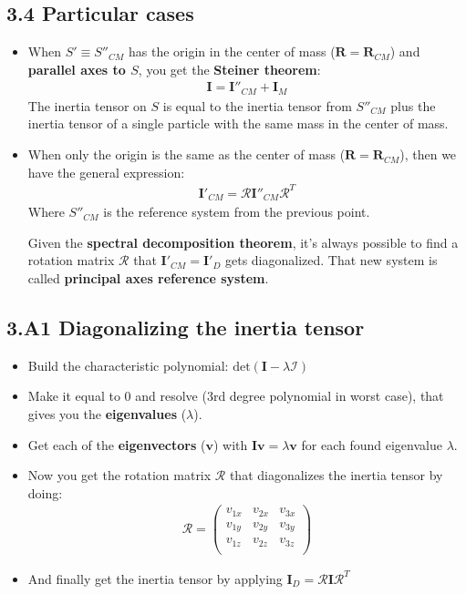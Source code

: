 \documentclass[a4paper,landscape,10pt]{cheatsheet}
\begin{document}
\subsection*{3.4 Particular cases}
\begin{itemize}
  \item When $S'\equiv S''_{CM}$ has the origin in the center of mass ($\textbf{R}=\textbf{R}_{CM}$) and
        \textbf{parallel axes to $S$}, you get the \textbf{Steiner theorem}:
        \begin{gather*}
          \textbf{I}=\textbf{I}''_{CM}+\textbf{I}_{M}
        \end{gather*}
        The inertia tensor on $S$ is equal to the inertia tensor from $S''_{CM}$ plus the inertia tensor of a single particle
        with the same mass in the center of mass.

  \item When only the origin is the same as the center of mass ($\textbf{R}=\textbf{R}_{CM}$), then we have the general
        expression:
        \begin{gather*}
          \textbf{I}'_{CM} = \mathcal{R}\textbf{I}''_{CM}\mathcal{R}^T
        \end{gather*}
        Where $S''_{CM}$ is the reference system from the previous point.

        Given the \textbf{spectral decomposition theorem}, it's always possible to find a rotation matrix $\mathcal{R}$ that $\textbf{I}'_{CM} = \textbf{I}'_D$ gets
        diagonalized. That new system is called \textbf{principal axes reference system}.
\end{itemize}

\subsection*{3.A1 Diagonalizing the inertia tensor}
\begin{itemize}
  \item Build the characteristic polynomial: $\text{det}(\textbf{I} - \lambda\mathcal{I})$
  \item Make it equal to 0 and resolve (3rd degree polynomial in worst case), that gives you the \textbf{eigenvalues}
        ($\lambda$).
  \item Get each of the \textbf{eigenvectors} ($\textbf{v}$) with $\textbf{I}\textbf{v} = \lambda\textbf{v}$ for each
        found eigenvalue $\lambda$.
  \item Now you get the rotation matrix $\mathcal{R}$ that diagonalizes the inertia tensor by doing:
        \begin{gather*}
          \mathcal{R} = \begin{pmatrix*}
            v_{1x} & v_{2x} & v_{3x} \\
            v_{1y} & v_{2y} & v_{3y} \\
            v_{1z} & v_{2z} & v_{3z} \\
          \end{pmatrix*}
        \end{gather*}
  \item And finally get the inertia tensor by applying $\textbf{I}_D = \mathcal{R}\textbf{I}\mathcal{R}^T$
\end{itemize}
\end{document}
